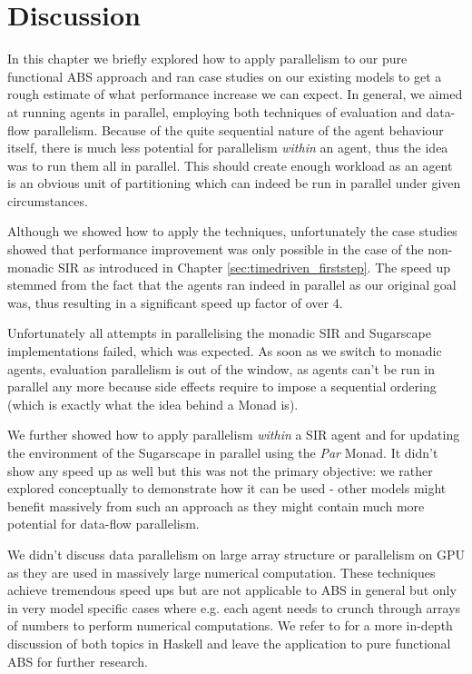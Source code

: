 \section{Discussion}
In this chapter we briefly explored how to apply parallelism to our pure functional ABS approach and ran case studies on our existing models to get a rough estimate of what performance increase we can expect. In general, we aimed at running agents in parallel, employing both techniques of evaluation and data-flow parallelism. Because of the quite sequential nature of the agent behaviour itself, there is much less potential for parallelism \textit{within} an agent, thus the idea was to run them all in parallel. This should create enough workload as an agent is an obvious unit of partitioning which can indeed be run in parallel under given circumstances.

Although we showed how to apply the techniques, unfortunately the case studies showed that performance improvement was only possible in the case of the non-monadic SIR as introduced in Chapter \ref{sec:timedriven_firststep}. The speed up stemmed from the fact that the agents ran indeed in parallel as our original goal was, thus resulting in a significant speed up factor of over 4. 

Unfortunately all attempts in parallelising the monadic SIR and Sugarscape implementations failed, which was expected. As soon as we switch to monadic agents, evaluation parallelism is out of the window, as agents can't be run in parallel any more because side effects require to impose a sequential ordering (which is exactly what the idea behind a Monad is).

We further showed how to apply parallelism \textit{within} a SIR agent and for updating the environment of the Sugarscape in parallel using the \textit{Par} Monad. It didn't show any speed up as well but this was not the primary objective: we rather explored conceptually to demonstrate how it can be used - other models might benefit massively from such an approach as they might contain much more potential for data-flow parallelism.

We didn't discuss data parallelism on large array structure or parallelism on GPU as they are used in massively large numerical computation. These techniques achieve tremendous speed ups but are not applicable to ABS in general but only in very model specific cases where e.g. each agent needs to crunch through arrays of numbers to perform numerical computations. We refer to \cite{marlow_parallel_2013} for a more in-depth discussion of both topics in Haskell and leave the application to pure functional ABS for further research.

